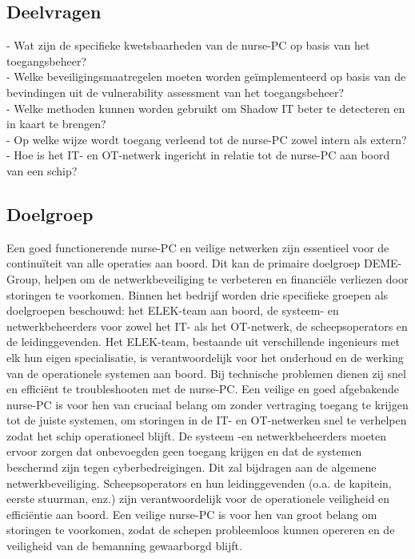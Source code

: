 \subsection{Deelvragen}   
- Wat zijn de specifieke kwetsbaarheden van de nurse-PC op basis van het toegangsbeheer? \\       
- Welke beveiligingsmaatregelen moeten worden geïmplementeerd op basis van de bevindingen uit de vulnerability assessment van het toegangsbeheer? \\
- Welke methoden kunnen worden gebruikt om Shadow IT beter te detecteren en in kaart te brengen? \\
- Op welke wijze wordt toegang verleend tot de nurse-PC zowel intern als extern? \\
- Hoe is het IT- en OT-netwerk ingericht in relatie tot de nurse-PC aan boord van een schip? \\

\subsection{Doelgroep}
Een goed functionerende nurse-PC en veilige netwerken zijn essentieel voor de continuïteit van alle operaties aan boord. 
Dit kan de primaire doelgroep DEME-Group, helpen om de netwerkbeveiliging te verbeteren en financiële verliezen door storingen te voorkomen.
Binnen het bedrijf worden drie specifieke groepen als doelgroepen beschouwd: het ELEK-team aan boord, de systeem- en netwerkbeheerders voor zowel het IT- als het OT-netwerk, de scheepsoperators en de leidinggevenden.
Het ELEK-team, bestaande uit verschillende ingenieurs met elk hun eigen specialisatie, is verantwoordelijk voor het onderhoud en de werking van de operationele systemen aan boord. Bij technische problemen dienen zij snel en efficiënt te troubleshooten met de nurse-PC.  
Een veilige en goed afgebakende nurse-PC is voor hen van cruciaal belang om zonder vertraging toegang te krijgen tot de juiste systemen, om storingen in de IT- en OT-netwerken snel te verhelpen zodat het schip operationeel blijft.
De systeem -en netwerkbeheerders moeten ervoor zorgen dat onbevoegden geen toegang krijgen en dat de systemen beschermd zijn tegen cyberbedreigingen. Dit zal bijdragen aan de algemene netwerkbeveiliging.
Scheepsoperators en hun leidinggevenden (o.a. de kapitein, eerste stuurman, enz.) zijn verantwoordelijk voor de operationele veiligheid en efficiëntie aan boord. Een veilige nurse-PC is voor hen van groot belang om storingen te voorkomen, 
zodat de schepen probleemloos kunnen opereren en de veiligheid van de bemanning gewaarborgd blijft.

